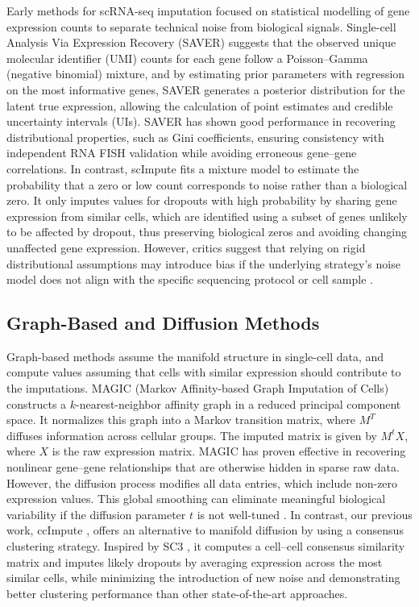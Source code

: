 \documentclass[sigconf,review]{acmart}
\theoremstyle{plain}
\theoremstyle{definition}
\theoremstyle{remark}
\begin{document}
Early methods for scRNA-seq imputation focused on statistical modelling of gene expression counts to separate technical noise from biological signals. Single-cell Analysis Via Expression Recovery (SAVER) \citep{Huang2018SAVER} suggests that the observed unique molecular identifier (UMI) counts for each gene follow a Poisson–Gamma (negative binomial) mixture, and by estimating prior parameters with regression on the most informative genes, SAVER generates a posterior distribution for the latent true expression, allowing the calculation of point estimates and credible uncertainty intervals (UIs). SAVER has shown good performance in recovering distributional properties, such as Gini coefficients, ensuring consistency with independent RNA FISH validation while avoiding erroneous gene–gene correlations. In contrast, scImpute \citep{Li2018scImpute} fits a mixture model to estimate the probability that a zero or low count  corresponds to noise rather than a biological zero. It only imputes values for dropouts with high probability by sharing gene expression from similar cells, which are identified using a subset of genes unlikely to be affected by dropout, thus preserving biological zeros and avoiding changing unaffected gene expression. However, critics suggest that relying on rigid distributional assumptions may introduce bias if the underlying strategy's noise model does not align with the specific sequencing protocol or cell sample \citep{Jiang2022ZeroInflationReview}.

\subsection{Graph-Based and Diffusion Methods} Graph-based methods assume the manifold structure in single-cell data, and compute values assuming that cells with similar expression should contribute to the imputations. MAGIC (Markov Affinity-based Graph Imputation of Cells) \citep{vanDijk2018MAGIC} constructs a $k$-nearest-neighbor affinity graph in a reduced principal component space. It normalizes this graph into a Markov transition matrix, where $M^T$ diffuses information across cellular groups. The imputed matrix is given by $M^t X$, where $X$ is the raw expression matrix. MAGIC has proven effective in recovering nonlinear gene–gene relationships that are otherwise hidden in sparse raw data. However, the diffusion process modifies all data entries, which include non-zero expression values. This global smoothing can eliminate meaningful biological variability if the diffusion parameter $t$ is not well-tuned \citep{Svensson2020NotZI}. In contrast, our previous work, ccImpute \citep{Malec2022ccImpute}, offers an alternative to manifold diffusion by using a consensus clustering strategy. Inspired by SC3 \citep{Kiselev2017SC3}, it computes a cell–cell consensus similarity matrix and imputes likely dropouts by averaging expression across the most similar cells, while minimizing the introduction of new noise and demonstrating better clustering performance than other state-of-the-art approaches.
\end{document}

